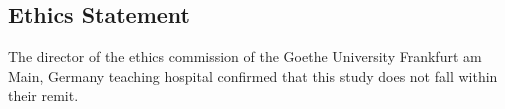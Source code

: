 \documentclass[10pt]{article}
\begin{document}
\subsection*{Ethics Statement}
The director of the ethics commission of the Goethe University Frankfurt am Main, Germany teaching hospital confirmed that this study does not fall within their remit.

%
%
%
\end{document}
